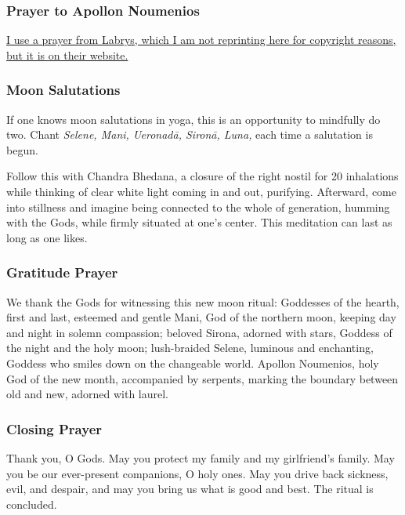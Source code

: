 \documentclass[
]{book}
\begin{document}
\hypertarget{prayer-to-apollon-noumenios}{%
\subsubsection{Prayer to Apollon Noumenios}\label{prayer-to-apollon-noumenios}}

\href{http://www.labrys.gr/en/text_noumenia.html}{I use a prayer from Labrys, which I am not reprinting here for copyright reasons, but it is on their website.}

\hypertarget{moon-salutations}{%
\subsubsection{Moon Salutations}\label{moon-salutations}}

If one knows moon salutations in yoga, this is an opportunity to mindfully do two. Chant \emph{Selene, Mani, Ueronadā, Sironā, Luna,} each time a salutation is begun.

Follow this with Chandra Bhedana, a closure of the right nostil for 20 inhalations while thinking of clear white light coming in and out, purifying. Afterward, come into stillness and imagine being connected to the whole of generation, humming with the Gods, while firmly situated at one's center. This meditation can last as long as one likes.

\hypertarget{gratitude-prayer}{%
\subsubsection{Gratitude Prayer}\label{gratitude-prayer}}

We thank the Gods for witnessing this new moon ritual:
Goddesses of the hearth, first and last,
esteemed and gentle Mani,
God of the northern moon,
keeping day and night in solemn compassion;
beloved Sirona, adorned with stars,
Goddess of the night and the holy moon;
lush-braided Selene, luminous and enchanting,
Goddess who smiles down on the changeable world.
Apollon Noumenios, holy God of the new month,
accompanied by serpents, marking the boundary
between old and new, adorned with laurel.

\hypertarget{closing-prayer}{%
\subsubsection{Closing Prayer}\label{closing-prayer}}

Thank you, O Gods.
May you protect my family and my girlfriend's family.
May you be our ever-present companions, O holy ones.
May you drive back sickness, evil, and despair,
and may you bring us what is good and best.
The ritual is concluded.
\end{document}
